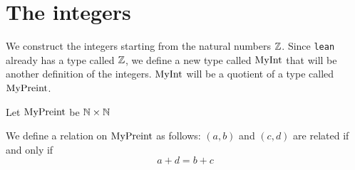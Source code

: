 \chapter{The integers}

We construct the integers starting from the natural numbers $\mathbb{Z}$. Since \texttt{lean} already has a
type called $\mathbb{Z}$, we define a new type called $\mathrm{MyInt}$ that will be another definition of the integers.
$\mathrm{MyInt}$ will be a quotient of a type called $\mathrm{MyPreint}$.

\begin{definition}
    \label{def:MyPreint}
    \leanok
    Let $\mathrm{MyPreint}$ be $\mathbb{N} \times \mathbb{N}$
\end{definition}

\begin{definition}
    \label{def:R}
    \leanok
We define a relation on $\mathrm{MyPreint}$ as follows: $(a,b)$ and $(c, d)$ are related if and only if
\[
a + d = b + c
\]
\end{definition}

